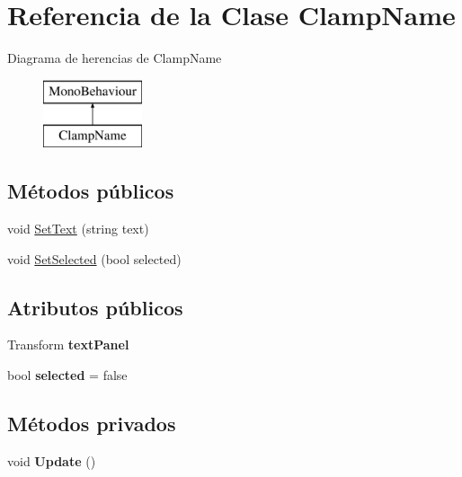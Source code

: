 \hypertarget{class_clamp_name}{}\section{Referencia de la Clase Clamp\+Name}
\label{class_clamp_name}
Diagrama de herencias de Clamp\+Name\begin{figure}[H]
\begin{center}
\leavevmode
\includegraphics[height=2.000000cm]{class_clamp_name}
\end{center}
\end{figure}
\subsection*{Métodos públicos}
\begin{DoxyCompactItemize}
\item 
void \mbox{\hyperlink{class_clamp_name_a8845016c54fa64235db1c72716098f96}{Set\+Text}} (string text)
\item 
void \mbox{\hyperlink{class_clamp_name_ae3850d4ccc21188089e261ab805c036b}{Set\+Selected}} (bool selected)
\end{DoxyCompactItemize}
\subsection*{Atributos públicos}
\begin{DoxyCompactItemize}
\item 
\mbox{\label{class_clamp_name_ad49af9dcd383039bcc2759c1c36e98a5}} 
Transform {\bfseries text\+Panel}
\item 
\mbox{\label{class_clamp_name_a2d7befc258d1492eec30282262971192}} 
bool {\bfseries selected} = false
\end{DoxyCompactItemize}
\subsection*{Métodos privados}
\begin{DoxyCompactItemize}
\item 
\mbox{\label{class_clamp_name_aaebb9af2778306a7994838a028dc3cc0}} 
void {\bfseries Update} ()
\end{DoxyCompactItemize}
